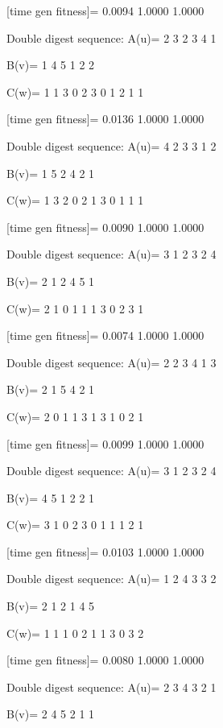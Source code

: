 [time gen fitness]=
    0.0094    1.0000    1.0000

Double digest sequence:
A(u)=
     2     3     2     3     4     1

B(v)=
     1     4     5     1     2     2

C(w)=
     1     1     3     0     2     3     0     1     2     1     1

[time gen fitness]=
    0.0136    1.0000    1.0000

Double digest sequence:
A(u)=
     4     2     3     3     1     2

B(v)=
     1     5     2     4     2     1

C(w)=
     1     3     2     0     2     1     3     0     1     1     1

[time gen fitness]=
    0.0090    1.0000    1.0000

Double digest sequence:
A(u)=
     3     1     2     3     2     4

B(v)=
     2     1     2     4     5     1

C(w)=
     2     1     0     1     1     1     3     0     2     3     1

[time gen fitness]=
    0.0074    1.0000    1.0000

Double digest sequence:
A(u)=
     2     2     3     4     1     3

B(v)=
     2     1     5     4     2     1

C(w)=
     2     0     1     1     3     1     3     1     0     2     1

[time gen fitness]=
    0.0099    1.0000    1.0000

Double digest sequence:
A(u)=
     3     1     2     3     2     4

B(v)=
     4     5     1     2     2     1

C(w)=
     3     1     0     2     3     0     1     1     1     2     1

[time gen fitness]=
    0.0103    1.0000    1.0000

Double digest sequence:
A(u)=
     1     2     4     3     3     2

B(v)=
     2     1     2     1     4     5

C(w)=
     1     1     1     0     2     1     1     3     0     3     2

[time gen fitness]=
    0.0080    1.0000    1.0000

Double digest sequence:
A(u)=
     2     3     4     3     2     1

B(v)=
     2     4     5     2     1     1

